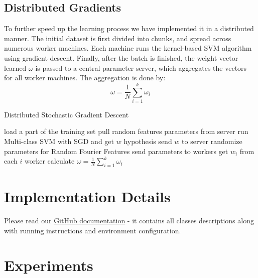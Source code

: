 \documentclass[12pt,a4paper]{article}
\begin{document}
\subsection{Distributed Gradients}
To further speed up the learning process we have implemented it in a distributed manner. The initial dataset is first divided into chunks, and spread across numerous worker machines. Each machine runs the kernel-based SVM algorithm using gradient descent. Finally, after the batch is finished, the weight vector learned $\omega$ is passed to a central parameter server, which aggregates the vectors for all worker machines. The aggregation is done by:
\begin{equation}
        \omega = \frac{1}{N}\sum^{k}_{i=1}\omega_i
\end{equation}

\begin{center}
\end{center}

\begin{algorithm}
        \caption{Distributed Stochastic Gradient Descent}
        \label{dsgd_alg}
        \begin{algorithmic}[1]
                \State load a part of the training set
                \State pull random features parameters from server
                \State run Multi-class SVM with SGD and get $w$ hypothesis
                \State send $w$ to server
                \EndProcedure
                \State randomize parameters for Random Fourier Features
                \State send parameters to workers
                \State get $w_i$ from each $i$ worker
                \State calculate $\omega = \frac{1}{N}\sum^{k}_{i=1}\omega_i$
                \EndProcedure
        \end{algorithmic}
\end{algorithm}

\section{Implementation Details}
Please read our \href{https://github.com/learningduo/distributed_random_features_svm}{GitHub documentation} - it contains all classes descriptions along with running instructions and environment configuration.

\section{Experiments}
\end{document}
